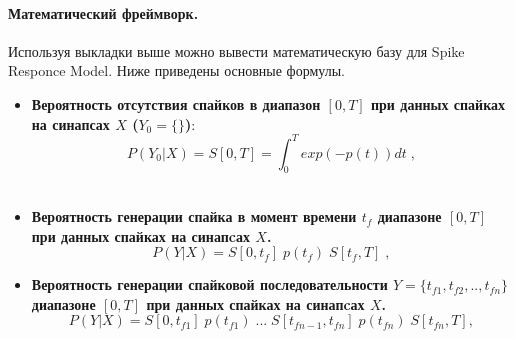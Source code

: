 \documentclass[a4paper,10pt]{article}
\begin{document}
\paragraph*{Математический фреймворк.} Используя выкладки выше можно вывести математическую базу для Spike Responce Model. Ниже приведены основные формулы.
\begin{itemize}
\item \textbf{Вероятность отсутствия спайков в диапазон $[0,T]$ при данных спайках на синапсах $X$ ($Y_{0} = \{\} $)}:
\begin{equation}\label{eq:p_y}
P(Y_{0}|X) = S[0,T] = \int_{0}^{T} exp(-p(t))dt\;,
\end{equation}
\\
\item \textbf{Вероятность генерации спайка в момент времени $t_{f}$ диапазоне $[0,T]$ при данных спайках на синапcах $X$.}
\begin{equation}\label{eq:p_y}
P(Y|X)= S[0,t_{f}]\; p(t_{f})\; S[t_{f},T]\;,
\end{equation}
\item \textbf{Вероятность генерации спайковой последовательности $Y = \{t_{f1},t_{f2},..,t_{fn}\}$ диапазоне $[0,T]$ при данных спайках на синапcах $X$.}
\begin{equation}\label{eq:p_y}
P(Y|X)= S[0,t_{f1}]\; p(t_{f1})\; ...\;S[t_{fn-1},t_{fn}]\;p(t_{fn}) \; S[t_{fn},T],
\end{equation}
\end{itemize}
\end{document}

